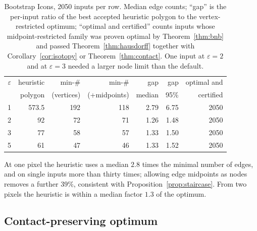 \documentclass[11pt,a4paper]{article}
\theoremstyle{definition}
\theoremstyle{remark}
\begin{document}
\begin{table}[h]
\centering
\caption{Bootstrap Icons, 2050 inputs per row. Median edge counts; ``gap'' is
the per-input ratio of the best accepted heuristic polygon to the
vertex-restricted optimum; ``optimal and certified'' counts inputs whose
midpoint-restricted family was proven optimal by Theorem~\ref{thm:bnb} and
passed Theorem~\ref{thm:hausdorff} together with Corollary~\ref{cor:isotopy}
or Theorem~\ref{thm:contact}. One input at $\varepsilon=2$ and at
$\varepsilon=3$ needed a larger node limit than the default.}
\label{tab:gap}
\begin{tabular}{rrrrrrr}
\toprule
$\varepsilon$ & heuristic & min-\# & min-\# & gap & gap & optimal and\\
 & polygon & (vertices) & (+midpoints) & median & 95\% & certified\\
\midrule
1 & 573.5 & 192 & 118 & 2.79 & 6.75 & 2050\\
2 & 92 & 72 & 71 & 1.26 & 1.48 & 2050\\
3 & 77 & 58 & 57 & 1.33 & 1.50 & 2050\\
5 & 61 & 47 & 46 & 1.33 & 1.52 & 2050\\
\bottomrule
\end{tabular}
\end{table}

At one pixel the heuristic uses a median $2.8$ times the minimal number of
edges, and on single inputs more than thirty times; allowing edge midpoints
as nodes removes a further $39\%$, consistent with
Proposition~\ref{prop:staircase}. From two pixels the heuristic is within a
median factor $1.3$ of the optimum.

\subsection{Contact-preserving optimum}\label{sec:constrained-results}
\end{document}

